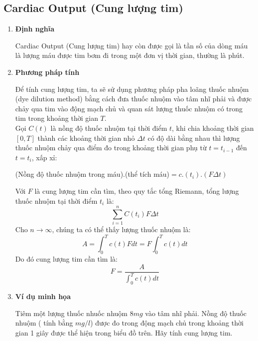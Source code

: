 \documentclass[12pt,a4paper]{article}
\begin{document}
\subsection{Cardiac Output (Cung lượng tim)}
\begin{enumerate}[a/]
	\item \textbf{Định nghĩa}
	      \begin{flushleft}
		      Cardiac Output (Cung lượng tim) hay còn được gọi là
		      tần số của dòng máu là lượng máu được tim bơm đi trong một đơn vị thời gian, thường là phút.
	      \end{flushleft}
	\item \textbf{Phương pháp tính}
	      \begin{flushleft}
		      Để tính cung lượng tim, ta sẽ sử dụng phương pháp pha loãng thuốc nhuộm
		      (dye dilution method) bằng cách đưa thuốc nhuộm vào tâm nhĩ phải và được
		      chảy qua tim vào động mạch chủ và quan sát lượng thuốc nhuộm có trong
		      tim trong khoảng thời gian $T$.\\
		      \vspace{1em}
		      Gọi $C(t)$ là nồng độ thuốc nhuộm tại thời điểm $t$, khi chia khoảng thời gian
		      $\left[0,T\right]$ thành các khoảng thời gian nhỏ $\Delta t$ có độ dài bằng
		      nhau thì lượng thuốc nhuộm chảy qua điểm đo trong khoảng thời gian phụ từ $t=t_{i-1}$ đến $t=t_i$, xấp xỉ:\\
		      \begin{center}
			      (Nồng độ thuốc nhuộm trong máu).(thể tích máu)$=c.(t_i).(F\Delta t)$
		      \end{center}
		      Với $F$ là cung lượng tim cần tìm, theo quy tắc tổng Riemann, tổng lượng thuốc nhuộm tại thời điểm $t_i$ là:
		      $$\sum_{i=1}^{n}C(t_i)F\Delta t$$
		      Cho $n \to \infty$, chúng ta có thể thấy lượng thuốc nhuộm là:
		      $$A=\int_{0}^{T}c(t)Fdt=F\int_{0}^{T}c(t)dt$$
		      Do đó cung lượng tim cần tìm là:
		      $$F=\frac{A}{\displaystyle \int_{0}^{T}c(t)dt}$$
	      \end{flushleft}
	\item \textbf{Ví dụ minh họa}
	      \begin{flushleft}
		      Tiêm một lượng thuốc nhuốc nhuộm $8mg$ vào tâm nhĩ phải. Nồng độ thuốc nhuộm ( tính bằng $mg/l$) được đo
		      trong động mạch chủ trong khoảng thời gian 1 giây được thể hiện trong biểu đồ trên.
		      Hãy tính cung lượng tim.
		      \begin{table}[H]

\end{table}
\end{flushleft}
\end{enumerate}
\end{document}
